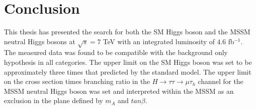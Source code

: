 \section{Conclusion}
This thesis has presented the search for both the SM Higgs boson and the MSSM neutral Higgs bosons at $\sqrt{s} = 7$ TeV with an integrated luminosity of $4.6$ fb$^{-1}$.
The measured data was found to be compatible with the background only hypothesis in all categories.
The upper limit on the SM Higgs boson was set to be approximately three times that predicted by the standard model. 
The upper limit on the cross section times branching ratio in the $H\rightarrow\tau\tau\rightarrow\mu\tau_{h}$ channel for the MSSM neutral Higgs boson was set and interpreted within the MSSM as an exclusion in the plane defined by $m_{A}$ and $tan\beta$.
